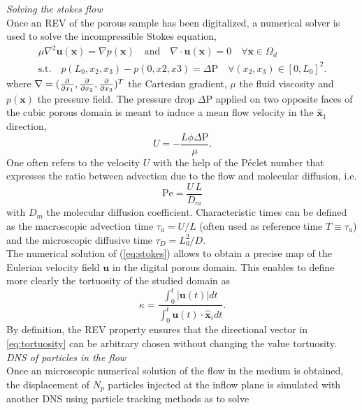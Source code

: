 \textit{Solving the stokes flow}\\
Once an REV of the porous sample has been digitalized, a numerical solver is used to solve the incompressible Stokes equation,
\begin{equation}\label{eq:stokes}
\begin{array}{c}
	\mu\nabla^2\textbf{u}(\textbf{x}) = \nabla p(\textbf{x}) \quad\textrm{and}\quad \nabla\cdot\textbf{u}(\textbf{x})=0\quad \forall \textbf{x}\in\Omega_d\\
	\textrm{s.t.}\quad p(L_0,x_2,x_3) - p(0,x2,x3) = \Delta\textrm{P} \quad \forall (x_2,x_3)\in[0,L_0]^2.
\end{array}
\end{equation}
where $\nabla = (\pdv{x_1},\pdv{x_2},\pdv{x_3})^T$ the Cartesian gradient, $\mu$ the fluid viscosity and $p(\textbf{x})$ the pressure field.
The pressure drop $\Delta\textrm{P}$ applied on two opposite faces of the cubic porous domain is meant to induce a mean flow velocity in the $\hat{\textbf{x}}_1$ direction, 
\[
U=-\frac{L \phi \Delta\textrm{P}}{\mu}.
\]
One often refers to the velocity $U$ with the help of the Péclet number that expresses the ratio between advection due to the flow and molecular diffusion, i.e.
\begin{equation}\label{eq:peclet}
\textrm{Pe}=\frac{U\,L}{D_m}
\end{equation}
with $D_m$ the molecular diffusion coefficient.
Characteristic times can be defined as the macroscopic advection time $\tau_a=U/L$ (often used as reference time $T\equiv\tau_a$) and the microscopic diffusive time $\tau_D=L_0^2/D$.\\
The numerical solution of (\ref{eq:stokes}) allows to obtain a precise map of the Eulerian velocity field $\textbf{u}$ in the digital porous domain. This enables to define more clearly the tortuosity of the studied domain as
\begin{equation}\label{eq:tortuosity}
\kappa=\frac{\int_0^t|\textbf{u}(t)|dt}{\int_0^t \textbf{u}(t)\cdot\hat{\textbf{x}}_idt}.
\end{equation}
By definition, the REV property ensures that the directional vector in \eqref{eq:tortuosity} can be arbitrary chosen without changing the value tortuosity.\\
\textit{DNS of particles in the flow}\\
Once an microscopic numerical solution of the flow in the medium is obtained, the displacement of $N_p$ particles injected at the inflow plane is simulated with another DNS using particle tracking methods as \citet{Pollock1988} to solve
